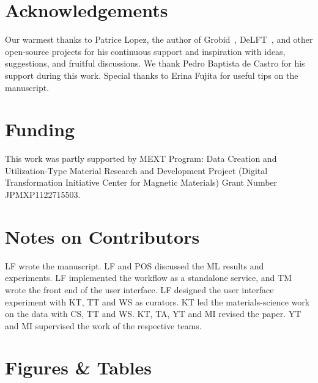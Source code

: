 \documentclass[]{interact}
\theoremstyle{plain} %
\theoremstyle{definition}
\theoremstyle{remark}
\begin{document}
\section*{Acknowledgements}
Our warmest thanks to Patrice Lopez, the author of Grobid~\cite{GROBID}, DeLFT~\cite{DeLFT}, and other open-source projects for his continuous support and inspiration with ideas, suggestions, and fruitful discussions.
We thank Pedro Baptista de Castro for his support during this work. 
Special thanks to Erina Fujita for useful tips on the manuscript. 


\section*{Funding}
This work was partly supported by MEXT Program: Data Creation and Utilization-Type Material Research and Development Project (Digital Transformation Initiative Center for Magnetic Materials) Grant Number JPMXP1122715503.


\section*{Notes on Contributors}
LF wrote the manuscript. 
LF and POS discussed the ML results and experiments. 
LF implemented the workflow as a standalone service, and TM wrote the front end of the user interface. 
LF designed the user interface experiment with KT, TT and WS as curators.
KT led the materials-science work on the data with CS, TT and WS.
KT, TA, YT and MI revised the paper.
YT and MI supervised the work of the respective teams. 





\section*{Figures \& Tables}
\end{document}
